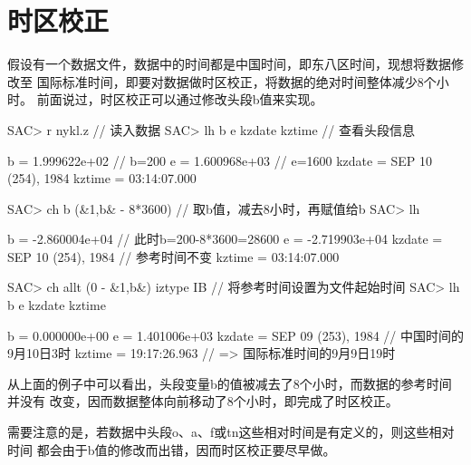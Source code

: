\section{时区校正}
\label{sec:time-zone-correction}
假设有一个数据文件，数据中的时间都是中国时间，即东八区时间，现想将数据修改至
国际标准时间，即要对数据做时区校正，将数据的绝对时间整体减少8个小时。
前面说过，时区校正可以通过修改头段b值来实现。

\begin{SACCode}
SAC> r nykl.z                           // 读入数据
SAC> lh b e kzdate kztime               // 查看头段信息

          b = 1.999622e+02              // b=200
          e = 1.600968e+03              // e=1600
     kzdate = SEP 10 (254), 1984
     kztime = 03:14:07.000

SAC> ch b (&1,b& - 8*3600)              // 取b值，减去8小时，再赋值给b
SAC> lh

          b = -2.860004e+04             // 此时b=200-8*3600=28600
          e = -2.719903e+04
     kzdate = SEP 10 (254), 1984        // 参考时间不变
     kztime = 03:14:07.000

SAC> ch allt (0 - &1,b&) iztype IB      // 将参考时间设置为文件起始时间
SAC> lh b e kzdate kztime

          b = 0.000000e+00
          e = 1.401006e+03
     kzdate = SEP 09 (253), 1984        // 中国时间的9月10日3时
     kztime = 19:17:26.963              // => 国际标准时间的9月9日19时
\end{SACCode}

从上面的例子中可以看出，头段变量b的值被减去了8个小时，而数据的参考时间并没有
改变，因而数据整体向前移动了8个小时，即完成了时区校正。

需要注意的是，若数据中头段o、a、f或tn这些相对时间是有定义的，则这些相对时间
都会由于b值的修改而出错，因而时区校正要尽早做。
